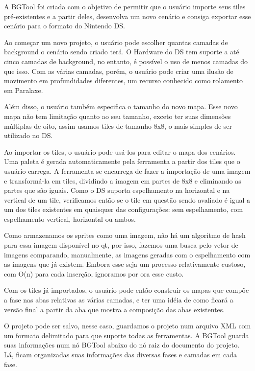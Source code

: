 \documentclass[brazil]{abnt}
\begin{document}
A BGTool foi criada com o objetivo de permitir que o usuário importe seus tiles pré-existentes e a partir deles, desenvolva um novo cenário e consiga exportar esse cenário para o formato do Nintendo DS. 

Ao começar um novo projeto, o usuário pode escolher quantas camadas de background o cenário sendo criado terá. O Hardware do DS tem suporte a até cinco camadas de background, no entanto, é possível o uso de menos camadas do que isso. Com as várias camadas, porém, o usuário pode criar uma ilusão de movimento em profundidades diferentes, um recurso conhecido como rolamento em Paralaxe.\footnotemark


Além disso, o usuário também especifica o tamanho do novo mapa. Esse novo mapa não tem limitação quanto ao seu tamanho, exceto ter suas dimensões múltiplas de oito, assim usamos tiles de tamanho 8x8, o mais simples de ser utilizado no DS.

Ao importar os tiles, o usuário pode usá-los para editar o mapa dos cenários. Uma paleta é gerada automaticamente pela ferramenta a partir dos tiles que o usuário carrega. A ferramenta se encarrega de fazer a importação de uma imagem e transformá-la em tiles, dividindo a imagem em partes de 8x8 e eliminando as partes que são iguais. Como o DS suporta espelhamento na horizontal e na vertical de um tile, verificamos então se o tile em questão sendo avaliado é igual a um dos tiles existentes em quaisquer das configurações: sem espelhamento, com espelhamento vertical, horizontal ou ambos.

Como armazenamos os sprites como uma imagem, não há um algoritmo de hash para essa imagem disponível no qt, por isso, fazemos uma busca pelo vetor de imagens comparando, manualmente, as imagens geradas com o espelhamento com as imagens que já existem. Embora esse seja um processo relativamente custoso, com O(n) para cada inserção, ignoramos por ora esse custo.

Com os tiles já importados, o usuário pode então construir os mapas que compõe a fase nas abas relativas as várias camadas, e ter uma idéia de como ficará a versão final a partir da aba que mostra a composição das abas existentes.

O projeto pode ser salvo, nesse caso, guardamos o projeto num arquivo XML com um formato delimitado para que suporte todas as ferramentas. A BGTool guarda suas informações num nó BGTool abaixo do nó raiz do documento do projeto. Lá, ficam organizadas suas informações das diversas fases e camadas em cada fase.
\end{document}
